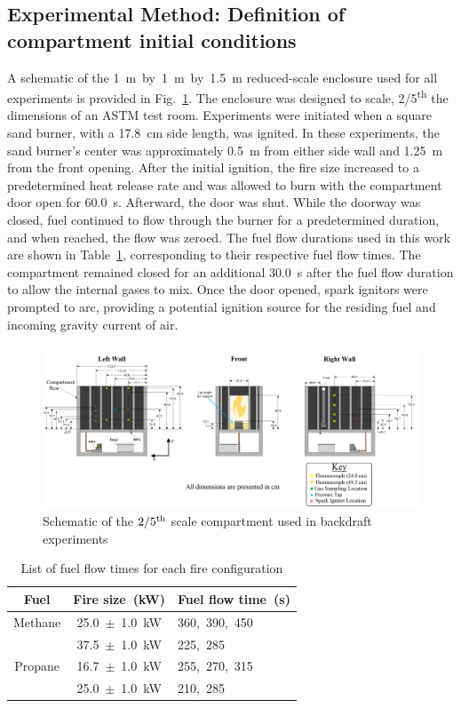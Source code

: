 \documentclass[12pt,letterpaper]{article}
\begin{document}
\begin{flushleft}
\section{Experimental Method: Definition of compartment initial conditions}
A schematic of the 1~m~by~1~m~by~1.5~m reduced-scale enclosure used for all experiments is provided in Fig.~\ref{fig:Backdraft_experimental_setup}. The enclosure was designed to scale, 2/5\textsuperscript{th} the dimensions of an ASTM test room. Experiments were initiated when a square sand burner, with a 17.8~cm side length, was ignited. In these experiments, the sand burner's center was approximately 0.5~m from either side wall and 1.25~m from the front opening. After the initial ignition, the fire size increased to a predetermined heat release rate and was allowed to burn with the compartment door open for 60.0~s. Afterward, the door was shut. While the doorway was closed, fuel continued to flow through the burner for a predetermined duration, and when reached, the flow was zeroed. The fuel flow durations used in this work are shown in Table~\ref{tab:Fuel_Flow_Time}, corresponding to their respective fuel flow times. The compartment remained closed for an additional 30.0~s after the fuel flow duration to allow the internal gases to mix. Once the door opened, spark ignitors were prompted to arc, providing a potential ignition source for the residing fuel and incoming gravity current of air.
\begin{figure}[!]
	\centering
\includegraphics[width=16.0cm, keepaspectratio]{Experimental_Setup_6.png}
	\caption{Schematic of the $2/5^{\rm{th}}$ scale compartment used in backdraft experiments}
	\label{fig:Backdraft_experimental_setup}
\end{figure}

\begin{table}[h!]
\caption{List of fuel flow times for each fire configuration}
\label{tab:Fuel_Flow_Time}
\centering
	\footnotesize
	\begin{tabular}{c c l}
\hline
Fuel & Fire size~(kW)	& Fuel flow time~(s)  \\
\hline
Methane & 25.0~$\pm$~1.0~kW 	& 360,~390,~450\\
	& 37.5~$\pm$~1.0~kW 	& 225,~285      \\
Propane & 16.7~$\pm$~1.0~kW		& 255,~270,~315	\\
	& 25.0~$\pm$~1.0~kW 	& 210,~285		 \\
\hline
\end{tabular}
\end{table}


\end{flushleft}
\end{document}
